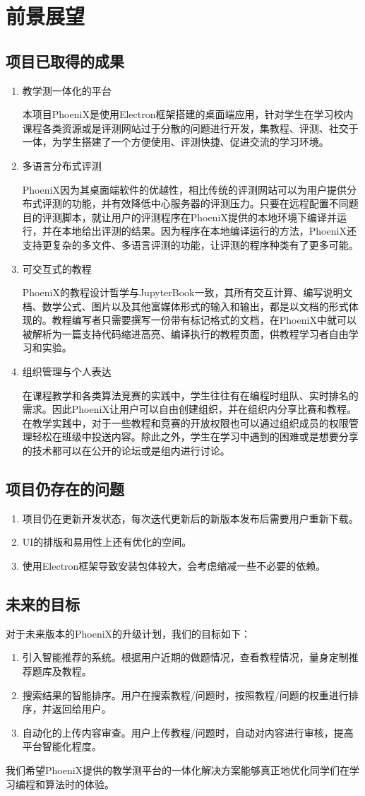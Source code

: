 \chapter{前景展望}

\section{项目已取得的成果}
\begin{enumerate}
    

\item{教学测一体化的平台}
\par
本项目PhoeniX是使用Electron框架搭建的桌面端应用，针对学生在学习校内课程各类资源或是评测网站过于分散的问题进行开发，集教程、评测、社交于一体，为学生搭建了一个方便使用、评测快捷、促进交流的学习环境。
\item{多语言分布式评测}
\par
PhoeniX因为其桌面端软件的优越性，相比传统的评测网站可以为用户提供分布式评测的功能，并有效降低中心服务器的评测压力。只要在远程配置不同题目的评测脚本，就让用户的评测程序在PhoeniX提供的本地环境下编译并运行，并在本地给出评测的结果。因为程序在本地编译运行的方法，PhoeniX还支持更复杂的多文件、多语言评测的功能，让评测的程序种类有了更多可能。

\item{可交互式的教程}
\par
PhoeniX的教程设计哲学与JupyterBook一致，其所有交互计算、编写说明文档、数学公式、图片以及其他富媒体形式的输入和输出，都是以文档的形式体现的。教程编写者只需要撰写一份带有标记格式的文档，在PhoeniX中就可以被解析为一篇支持代码缩进高亮、编译执行的教程页面，供教程学习者自由学习和实验。
\item{组织管理与个人表达}
\par
在课程教学和各类算法竞赛的实践中，学生往往有在编程时组队、实时排名的需求。因此PhoeniX让用户可以自由创建组织，并在组织内分享比赛和教程。在教学实践中，对于一些教程和竞赛的开放权限也可以通过组织成员的权限管理轻松在班级中投送内容。除此之外，学生在学习中遇到的困难或是想要分享的技术都可以在公开的论坛或是组内进行讨论。
\end{enumerate}
\newpage

\section{项目仍存在的问题}
\begin{enumerate}
    \item 项目仍在更新开发状态，每次迭代更新后的新版本发布后需要用户重新下载。
    \item UI的排版和易用性上还有优化的空间。
    \item 使用Electron框架导致安装包体较大，会考虑缩减一些不必要的依赖。
\end{enumerate}
\section{未来的目标}
对于未来版本的PhoeniX的升级计划，我们的目标如下：
\begin{enumerate}
    \item 引入智能推荐的系统。根据用户近期的做题情况，查看教程情况，量身定制推荐题库及教程。
    \item 搜索结果的智能排序。用户在搜索教程/问题时，按照教程/问题的权重进行排序，并返回给用户。
    \item 自动化的上传内容审查。用户上传教程/问题时，自动对内容进行审核，提高平台智能化程度。
\end{enumerate}
我们希望PhoeniX提供的教学测平台的一体化解决方案能够真正地优化同学们在学习编程和算法时的体验。

